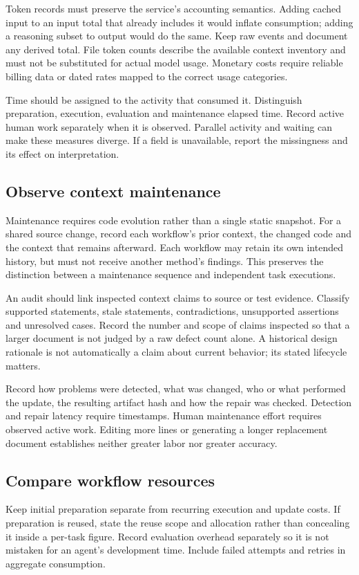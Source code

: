 \documentclass[11pt,letterpaper,twocolumn]{article}
\begin{document}
Token records must preserve the service's accounting semantics. Adding cached input to an input total that already includes it would inflate consumption; adding a reasoning subset to output would do the same. Keep raw events and document any derived total. File token counts describe the available context inventory and must not be substituted for actual model usage. Monetary costs require reliable billing data or dated rates mapped to the correct usage categories.

Time should be assigned to the activity that consumed it. Distinguish preparation, execution, evaluation and maintenance elapsed time. Record active human work separately when it is observed. Parallel activity and waiting can make these measures diverge. If a field is unavailable, report the missingness and its effect on interpretation.

\subsection{Observe context maintenance}
Maintenance requires code evolution rather than a single static snapshot. For a shared source change, record each workflow's prior context, the changed code and the context that remains afterward. Each workflow may retain its own intended history, but must not receive another method's findings. This preserves the distinction between a maintenance sequence and independent task executions.

An audit should link inspected context claims to source or test evidence. Classify supported statements, stale statements, contradictions, unsupported assertions and unresolved cases. Record the number and scope of claims inspected so that a larger document is not judged by a raw defect count alone. A historical design rationale is not automatically a claim about current behavior; its stated lifecycle matters.

Record how problems were detected, what was changed, who or what performed the update, the resulting artifact hash and how the repair was checked. Detection and repair latency require timestamps. Human maintenance effort requires observed active work. Editing more lines or generating a longer replacement document establishes neither greater labor nor greater accuracy.

\subsection{Compare workflow resources}
Keep initial preparation separate from recurring execution and update costs. If preparation is reused, state the reuse scope and allocation rather than concealing it inside a per-task figure. Record evaluation overhead separately so it is not mistaken for an agent's development time. Include failed attempts and retries in aggregate consumption.
\end{document}
